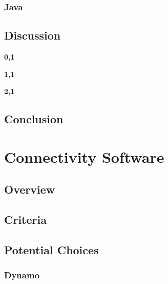 \documentclass[letterpaper,10pt,onecolumn,compsoc]{IEEEtran}
\begin{document}
\noindent


\subsubsection{Java}

\noindent


\subsection{Discussion}

\noindent\leavevmode{}\hfill{\textbf{0,1}}\hfill{}\par

\noindent\leavevmode{}\hfill{\textbf{1,1}}\hfill{}\par

\noindent\leavevmode{}\hfill{\textbf{2,1}}\hfill{}\par

\subsection{Conclusion}



\newpage

\iffalse
\fi

\section{Connectivity Software}
\subsection{Overview}

\noindent



\subsection{Criteria}

\noindent


\subsection{Potential Choices}
\subsubsection{Dynamo}
\end{document}

